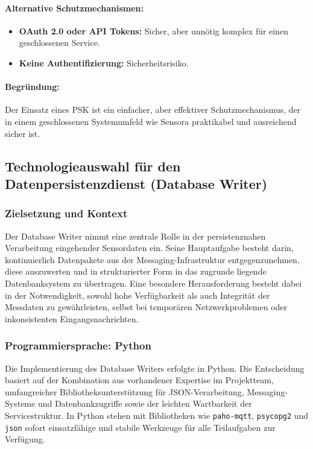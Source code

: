 \paragraph*{Alternative Schutzmechanismen:}
\begin{itemize}
  \item \textbf{OAuth 2.0 oder API Tokens:} Sicher, aber unn\"otig komplex f\"ur einen geschlossenen Service.
  \item \textbf{Keine Authentifizierung:} Sicherheitsrisiko.
\end{itemize}

\paragraph*{Begr\"undung:}

Der Einsatz eines PSK ist ein einfacher, aber effektiver Schutzmechanismus, der in einem geschlossenen Systemumfeld wie Sensora praktikabel und ausreichend sicher ist.

\subsection{Technologieauswahl f\"ur den Datenpersistenzdienst (Database Writer)}

\subsubsection*{Zielsetzung und Kontext}

Der Database Writer nimmt eine zentrale Rolle in der persistenznahen Verarbeitung eingehender Sensordaten ein. Seine Hauptaufgabe besteht darin, kontinuierlich Datenpakete aus der Messaging-Infrastruktur entgegenzunehmen, diese auszuwerten und in strukturierter Form in das zugrunde liegende Datenbanksystem zu \"ubertragen. Eine besondere Herausforderung besteht dabei in der Notwendigkeit, sowohl hohe Verf\"ugbarkeit als auch Integrit\"at der Messdaten zu gew\"ahrleisten, selbst bei tempor\"aren Netzwerkproblemen oder inkonsistenten Eingangsnachrichten.

\subsubsection*{Programmiersprache: Python}

Die Implementierung des Database Writers erfolgte in Python. Die Entscheidung basiert auf der Kombination aus vorhandener Expertise im Projektteam, umfangreicher Bibliotheksunterstützung für JSON-Verarbeitung, Messaging-Systeme und Datenbankzugriffe sowie der leichten Wartbarkeit der Servicestruktur. In Python stehen mit Bibliotheken wie \texttt{paho-mqtt}\cite{python_mqtt}, \texttt{psycopg2} und \texttt{json} sofort einsatzfähige und stabile Werkzeuge für alle Teilaufgaben zur Verfügung.

